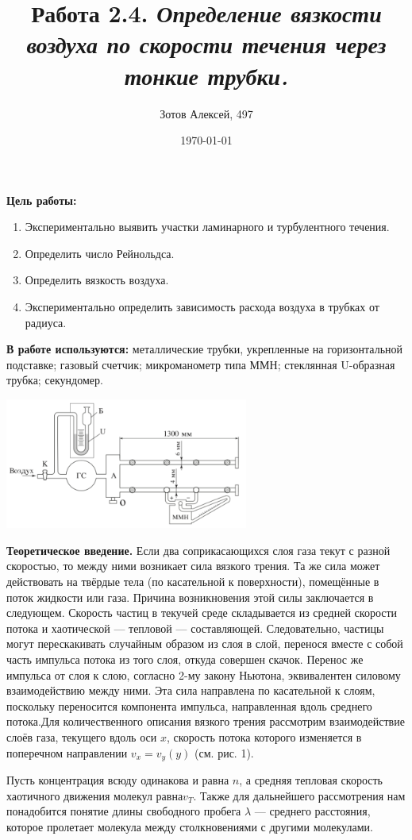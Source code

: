 \documentclass[10pt]{article}
\title{Работа 2.4. {\it Определение вязкости воздуха
по скорости течения через тонкие трубки.}}
\author{Зотов Алексей, 497}
\date{\today}
\begin{document}
\maketitle
\textbf{Цель работы:}
    \begin{enumerate}
    \item Экспериментально выявить участки ламинарного и турбулентного течения.
    \item Определить число Рейнольдса. 
    \item Определить вязкость воздуха.
    \item Экспериментально определить зависимость расхода воздуха в трубках от радиуса.
    \end{enumerate}
\textbf{В работе используются:} металлические трубки, укрепленные на горизонтальной подставке; газовый счетчик; микроманометр типа ММН; стеклянная U-образная трубка; секундомер.
\begin{center}
    \includegraphics[width=8cm]{ust.png}
\end{center}

\textbf{Теоретическое введение.}
Если два соприкасающихся слоя газа текут с разной скоростью, то между ними возникает сила вязкого трения. Та же сила может действовать на твёрдые тела (по касательной к поверхности), помещённые в поток жидкости или газа. Причина возникновения этой силы заключается в следующем. Скорость частиц в текучей среде складывается из средней скорости потока и хаотической  — тепловой — составляющей. Следовательно, частицы могут перескакивать случайным образом из слоя в слой, перенося вместе с собой часть импульса потока из того слоя, откуда совершен скачок. Перенос же импульса от слоя к слою, согласно 2-му закону Ньютона, эквивалентен силовому взаимодействию между ними. Эта сила направлена по касательной к слоям, поскольку переносится компонента импульса, направленная вдоль среднего потока.Для количественного описания вязкого трения рассмотрим взаимодействие слоёв газа, текущего вдоль оси $x$, скорость потока которого изменяется в поперечном направлении $v_x = v_y(y)$ (см. рис. 1).

Пусть концентрация всюду одинакова и равна $n$, а средняя тепловая скорость хаотичного движения молекул равна$v_T$. Также для дальнейшего рассмотрения нам понадобится понятие длины свободного пробега $\lambda$
— среднего расстояния, которое пролетает молекула между столкновениями с другими молекулами.
\end{document}
